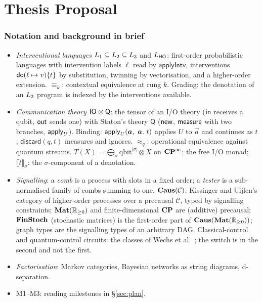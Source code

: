 \part{Thesis Proposal}

\section*{Notation and background in brief}
\begin{itemize}[nosep]
\item \emph{Interventional languages} $L_{1}\subseteq L_{2}\subseteq L_{3}$ and $L_{\mathsf{HO}}$: first-order probabilistic languages with intervention labels $\ell$ read by $\mathsf{applyIntv}$, interventions $\mathsf{do}(\ell\mapsto v)\{t\}$ by substitution, twinning by vectorisation, and a higher-order extension. $\equiv_k$: contextual equivalence at rung $k$. Grading: the denotation of an $L_{2}$ program is indexed by the interventions available.
\item \emph{Communication theory} $\mathsf{IO}\otimes\mathsf{Q}$: the tensor of an I/O theory ($\mathsf{in}$ receives a qubit, $\mathsf{out}$ sends one) with Staton's theory $\mathsf{Q}$ ($\mathsf{new}$, $\mathsf{measure}$ with two branches, $\mathsf{apply}_{U}$). Binding: $\mathsf{apply}_{U}(\bm a,\ \bm a.\ t)$ applies $U$ to $\vec a$ and continues as $t$; $\mathsf{discard}(q, t)$ measures and ignores. $\approx_q$: operational equivalence against quantum streams. $T(X)=\bigoplus_\sigma \mathrm{qbit}^{|\sigma|}\otimes X$ on $\mathbf{CP}^{\infty}$: the free I/O monad; $\llbracket t\rrbracket_\sigma$: the $\sigma$-component of a denotation.
\item \emph{Signalling}: a \emph{comb} is a process with slots in a fixed order; a \emph{tester} is a sub-normalised family of combs summing to one. $\mathbf{Caus}(\mathcal{C})$: Kissinger and Uijlen's category of higher-order processes over a precausal $\mathcal{C}$, typed by signalling constraints; $\mathbf{Mat}(\mathbb{R}_{\geq 0})$ and finite-dimensional $\mathbf{CP}$ are (additive) precausal; $\mathbf{FinStoch}$ (stochastic matrices) is the first-order part of $\mathbf{Caus}(\mathbf{Mat}(\mathbb{R}_{\geq 0}))$; graph types \cite{simmons2024thesis} are the signalling types of an arbitrary DAG. Classical-control and quantum-control circuits: the classes of Wechs et al.\ \cite{wechs2021qcqc}; the switch is in the second and not the first.
\item \emph{Factorisation}: Markov categories, Bayesian networks as string diagrams, d-separation.
\item M1--M3: reading milestones in \S\ref{sec:plan}.
\end{itemize}

